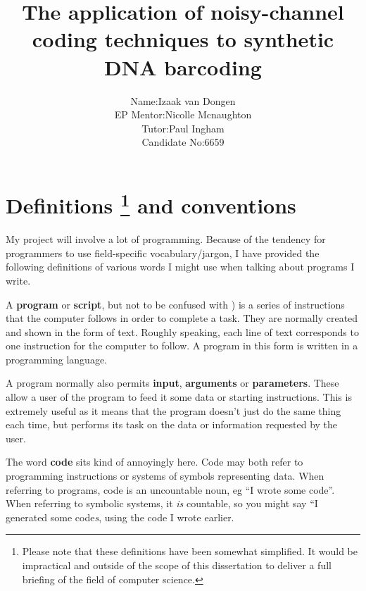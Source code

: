 \documentclass[a4paper,11pt]{article}
\title{The application of noisy-channel coding techniques to synthetic DNA barcoding}
\author{\begin{tabular}{rl}
                Name:& Izaak van Dongen\\
           EP Mentor:& Nicolle Mcnaughton\\
               Tutor:& Paul Ingham\\
        Candidate No:&  6659\\
        \end{tabular}
        }
\begin{document}
    \maketitle\thispagestyle{empty} %
    \tableofcontents
    \listoflistings
    \listoffigures
    \listoftables



    \section[Definitions and conventions]{Definitions \footnote{Please note that
    these definitions have been somewhat simplified. It would be impractical and
    outside of the scope of this dissertation to deliver a full briefing of
    the field of computer science.} and conventions}

    My project will involve a lot of programming. Because of the tendency for
    programmers to use field-specific vocabulary/jargon, I have provided the
    following definitions of various words I might use when talking about
    programs I write.

    \begin{definition}
    A \textbf{program} or \textbf{script}, but not to be
    confused with ) is a series of
    instructions that the computer follows in order to complete a task. They are
    normally created and shown in the form of text. Roughly speaking, each line
    of text corresponds to one instruction for the computer to follow. A program
    in this form is written in a programming language.
    \end{definition}

    \begin{definition}
    A program normally also permits \textbf{input}, \textbf{arguments} or
    \textbf{parameters}. These allow a user of the program to feed it some data
    or starting instructions. This is extremely useful as it means that the
    program doesn't just do the same thing each time, but performs its task on
    the data or information requested by the user.
    \end{definition}

    \begin{definition}
    The word \textbf{code} sits kind of annoyingly here. Code may both refer to
    programming instructions or systems of symbols representing data. When
    referring to programs, code is an uncountable noun, eg ``I wrote some
    code''. When referring to symbolic systems, it \textit{is} countable, so you
    might say ``I generated some code\textit{s}, using the code I wrote earlier.
    \end{definition}
\end{document}
